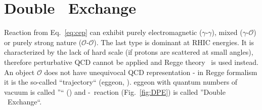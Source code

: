 \section{Double \Pomeron\  Exchange}\label{sec:DPE}
Reaction from Eq.~\ref{eq:cep} can exhibit purely electromagnetic ($\gamma$-$\gamma$), mixed ($\gamma$-$\mathcal{O}$) or purely strong nature ($\mathcal{O}$-$\mathcal{O}$). The last type is dominant at RHIC energies. It is characterized by the lack of hard scale (if protons are scattered at small angles), therefore perturbative QCD cannot be applied and Regge theory~\cite{IntroductionToRegge} is used instead. An object $\mathcal{O}$ does not have unequivocal QCD representation - in Regge formalism it is the so-called ``trajectory`` (\Reg eggeon, \Reg). \Reg eggeon with quantum numbers of vacuum is called ''\Pomeron`` (\Pom) and \Pom-\Pom\ reaction (Fig.~\ref{fig:DPE}) is called ''Double \Pomeron\  Exchange``. %

